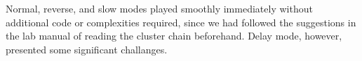 \documentclass[12pt]{article}
\begin{document}

Normal, reverse, and slow modes played smoothly immediately without additional
code or complexities required, since we had followed the suggestions in the
lab manual of reading the cluster chain beforehand. Delay mode, however,
presented some significant challanges.






\end{document}
